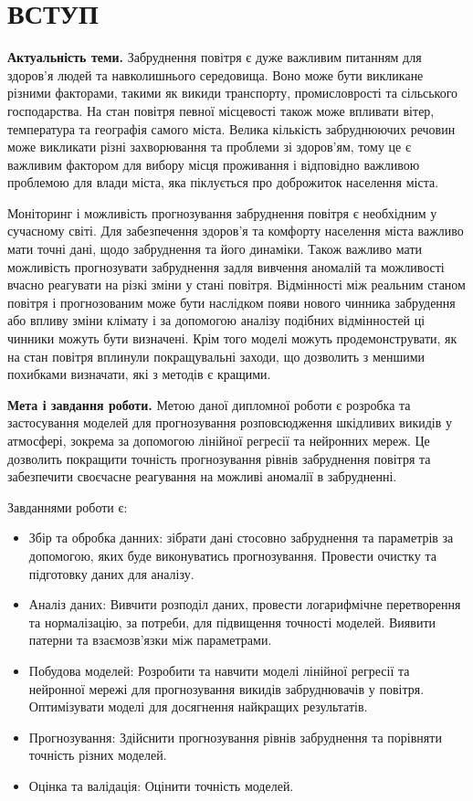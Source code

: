 \chapter*{ВСТУП}

{\bf{Актуальність теми.}}
Забруднення повітря є дуже важливим питанням для здоров'я людей та навколишнього середовища.
Воно може бути викликане різними факторами, такими як викиди транспорту, промисловрості та 
сільського господарства. На стан повітря певної місцевості також може впливати вітер, 
температура та географія самого міста. Велика кількість забруднюючих речовин може викликати 
різні захворювання та проблеми зі здоров'ям, тому це є важливим фактором для вибору місця 
проживання і відповідно важливою проблемою для влади міста, яка піклується про доброжиток 
населення міста.


Моніторинг і можливість прогнозування забруднення повітря є необхідним у сучасному світі. 
Для забезпечення здоров'я та комфорту населення міста важливо мати точні дані, щодо забруднення 
та його динаміки. Також важливо мати можливість прогнозувати забруднення задля вивчення 
аномалій та можливості вчасно реагувати на різкі зміни у стані повітря. Відмінності між 
реальним станом повітря і прогнозованим може бути наслідком появи нового чинника забрудення 
або впливу зміни клімату і за допомогою аналізу подібних відмінностей ці чинники можуть 
бути визначені.
Крім того моделі можуть продемонструвати, як на стан повітря вплинули покращувальні заходи,
що дозволить з меншими похибками визначати, які з методів є кращими. 

{\bf{Мета і завдання роботи.}}  
Метою даної дипломної роботи є розробка та застосування моделей для прогнозування розповсюдження шкідливих викидів у атмосфері, зокрема за допомогою лінійної регресії та нейронних мереж. Це дозволить покращити точність прогнозування рівнів забруднення повітря та забезпечити своєчасне реагування на можливі аномалії в забрудненні.

Завданнями роботи є:
\begin{itemize}
    \item Збір та обробка данних: зібрати дані стосовно забруднення та параметрів за допомогою, яких буде виконуватись прогнозування. Провести очистку та підготовку даних для аналізу.
    \item Аналіз даних: Вивчити розподіл даних, провести логарифмічне перетворення та нормалізацію, за потреби, для підвищення точності моделей. Виявити патерни та взаємозв'язки між параметрами.
    \item Побудова моделей: Розробити та навчити моделі лінійної регресії та нейронної мережі для прогнозування викидів забруднювачів у повітря. Оптимізувати моделі для досягнення найкращих результатів.
    \item Прогнозування: Здійснити прогнозування рівнів забруднення та порівняти точність різних моделей.
    \item Оцінка та валідація: Оцінити точність моделей.
\end{itemize}

